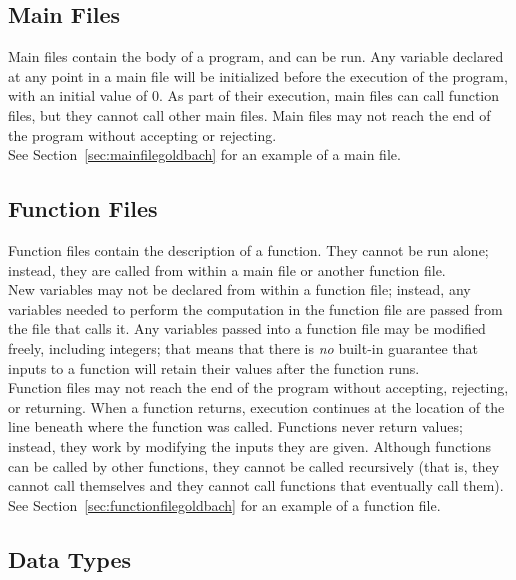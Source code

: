 \subsection{Main Files}

Main files contain the body of a program, and can be run. Any variable declared at any point in a main file will be initialized before the execution of the program, with an initial value of 0. As part of their execution, main files can call function files, but they cannot call other main files. Main files may not reach the end of the program without accepting or rejecting. \\

See Section~\ref{sec:mainfilegoldbach} for an example of a main file.

\subsection{Function Files}

Function files contain the description of a function. They cannot be run alone; instead, they are called from within a main file or another function file. \\
  
New variables may not be declared from within a function file; instead, any variables needed to perform the computation in the function file are passed from the file that calls it. Any variables passed into a function file may be modified freely, including integers; that means that there is \emph{no} built-in guarantee that inputs to a function will retain their values after the function runs. \\

Function files may not reach the end of the program without accepting, rejecting, or returning. When a function returns, execution continues at the location of the line beneath where the function was called. Functions never return values; instead, they work by modifying the inputs they are given. Although functions can be called by other functions, they cannot be called recursively (that is, they cannot call themselves and they cannot call functions that eventually call them). \\

See Section~\ref{sec:functionfilegoldbach} for an example of a function file.

\subsection{Data Types}

